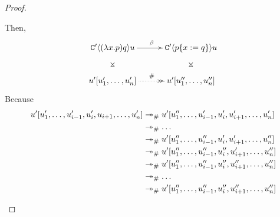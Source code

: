 \begin{proof}
\begin{enumerate}
Then,
\[
\xymatrix@C=1cm{
 \contwoof{(\lam{\var}{\tmfive}) \tmsix} \tmthree \ar@{}[d]|*=0[@]{\rtimes} \ar[r]^{\beta}
    & \contwoof{\subs{\tmfive}{\var}{\tmsix}} \tmthree \ar@{}[d]|*=0[@]{\rtimes} \\
 \tmthree' [\tmthree'_1, \hdots, \tmthree'_n] \ar@{.>>}[r]^{\dist}
    & \tmthree' [\tmthree''_1, \hdots, \tmthree''_n] \\
}
\]
Because
\begin{equation*}\begin{split}
 u' [u'_1, \hdots, u'_{i-1}, u'_i, u_{i+1}, \hdots, u'_n]
    & \mathrel{\mathrel{\twoheadrightarrow}_{\mathtt{\#}}} u' [u''_1, \hdots, u'_{i-1}, u'_i, u'_{i+1}, \hdots, u'_n] \\
    & \mathrel{\mathrel{\twoheadrightarrow}_{\mathtt{\#}}} \hdots \\
    & \mathrel{\mathrel{\twoheadrightarrow}_{\mathtt{\#}}} u' [u''_1, \hdots, u''_{i-1}, u'_i, u'_{i+1}, \hdots, u''_n] \\
    & \mathrel{\mathrel{\twoheadrightarrow}_{\mathtt{\#}}} u' [u''_1, \hdots, u''_{i-1}, u''_i, u'_{i+1}, \hdots, u''_n] \\
    & \mathrel{\mathrel{\twoheadrightarrow}_{\mathtt{\#}}} u' [u''_1, \hdots, u''_{i-1}, u''_i, u''_{i+1}, \hdots, u''_n] \\
    & \mathrel{\mathrel{\twoheadrightarrow}_{\mathtt{\#}}} \hdots \\
    & \mathrel{\mathrel{\twoheadrightarrow}_{\mathtt{\#}}} u' [u''_1, \hdots, u''_{i-1}, u''_i, u''_{i+1}, \hdots, u''_n] \\
\end{split}\end{equation*}
\end{enumerate}
\end{proof}
